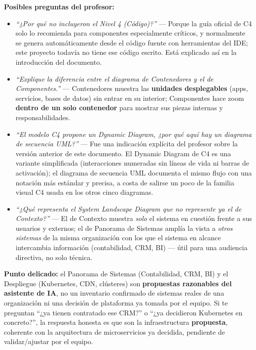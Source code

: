 \documentclass[12pt,a4paper]{article}
\begin{document}
\begin{pregunta}
\textbf{Posibles preguntas del profesor:}
\begin{itemize}
\item \textit{``¿Por qué no incluyeron el Nivel 4 (Código)?''} --- Porque la guía oficial de C4
solo lo recomienda para componentes especialmente críticos, y normalmente se genera automáticamente
desde el código fuente con herramientas del IDE; este proyecto todavía no tiene ese código escrito.
Está explicado así en la introducción del documento.
\item \textit{``Explique la diferencia entre el diagrama de Contenedores y el de Componentes.''}
--- Contenedores muestra las \textbf{unidades desplegables} (apps, servicios, bases de datos) sin
entrar en su interior; Componentes hace zoom \textbf{dentro de un solo contenedor} para mostrar sus
piezas internas y responsabilidades.
\item \textit{``El modelo C4 propone un Dynamic Diagram, ¿por qué aquí hay un diagrama de secuencia
UML?''} --- Fue una indicación explícita del profesor sobre la versión anterior de este documento.
El Dynamic Diagram de C4 es una variante simplificada (interacciones numeradas sin líneas de vida
ni barras de activación); el diagrama de secuencia UML documenta el mismo flujo con una notación
más estándar y precisa, a costa de salirse un poco de la familia visual C4 usada en los otros cinco
diagramas.
\item \textit{``¿Qué representa el System Landscape Diagram que no represente ya el de Contexto?''}
--- El de Contexto muestra \emph{solo} el sistema en cuestión frente a sus usuarios y externos; el
de Panorama de Sistemas amplía la vista a \emph{otros sistemas} de la misma organización con los
que el sistema en alcance intercambia información (contabilidad, CRM, BI) --- útil para una
audiencia directiva, no solo técnica.
\end{itemize}
\end{pregunta}

\begin{alerta}
\textbf{Punto delicado:} el Panorama de Sistemas (Contabilidad, CRM, BI) y el Despliegue
(Kubernetes, CDN, clústeres) son \textbf{propuestas razonables del asistente de IA}, no un
inventario confirmado de sistemas reales de una organización ni una decisión de plataforma ya
tomada por el equipo. Si te preguntan ``¿ya tienen contratado ese CRM?'' o ``¿ya decidieron
Kubernetes en concreto?'', la respuesta honesta es que son la infraestructura \textbf{propuesta},
coherente con la arquitectura de microservicios ya decidida, pendiente de validar/ajustar por el
equipo.
\end{alerta}
\end{document}
